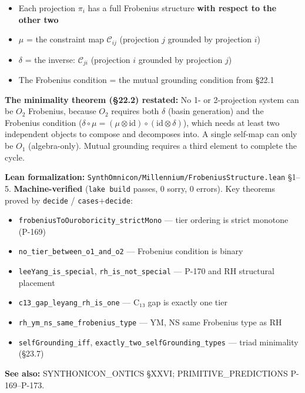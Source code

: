 \documentclass[12pt,a4paper]{article}
\newcommand{\pilcrow}{\S}
\begin{document}
\begin{itemize}
    \item Each projection $\pi_i$ has a full Frobenius structure \textbf{with respect to the other two}
    \item $\mu$ = the constraint map $\mathcal{C}_{ij}$ (projection $j$ grounded by projection $i$)
    \item $\delta$ = the inverse: $\mathcal{C}_{ji}$ (projection $i$ grounded by projection $j$)
    \item The Frobenius condition = the mutual grounding condition from \pilcrow{}22.1
\end{itemize}

\textbf{The minimality theorem (\pilcrow{}22.2) restated:} No 1- or 2-projection system can be $O_2$ Frobenius, because $O_2$ requires both $\delta$ (basin generation) and the Frobenius condition ($\delta \circ \mu = (\mu \otimes \text{id}) \circ (\text{id} \otimes \delta)$), which needs at least two independent objects to compose and decomposes into. A single self-map can only be $O_1$ (algebra-only). Mutual grounding requires a third element to complete the cycle.

\textbf{Lean formalization:} \texttt{SynthOmnicon/Millennium/FrobeniusStructure.lean} \pilcrow{}1--5. \textbf{Machine-verified} (\texttt{lake build} passes, 0 sorry, 0 errors). Key theorems proved by \texttt{decide} / \texttt{cases}+\texttt{decide}:

\begin{itemize}
    \item \texttt{frobeniusToOuroboricity\_strictMono} --- tier ordering is strict monotone (P-169)
    \item \texttt{no\_tier\_between\_o1\_and\_o2} --- Frobenius condition is binary
    \item \texttt{leeYang\_is\_special}, \texttt{rh\_is\_not\_special} --- P-170 and RH structural placement
    \item \texttt{c13\_gap\_leyang\_rh\_is\_one} --- C₁₃ gap is exactly one tier
    \item \texttt{rh\_ym\_ns\_same\_frobenius\_type} --- YM, NS same Frobenius type as RH
    \item \texttt{selfGrounding\_iff}, \texttt{exactly\_two\_selfGrounding\_types} --- triad minimality (\pilcrow{}23.7)
\end{itemize}

\textbf{See also:} SYNTHONICON\_ONTICS \pilcrow{}XXVI; PRIMITIVE\_PREDICTIONS P-169--P-173.
\end{document}
